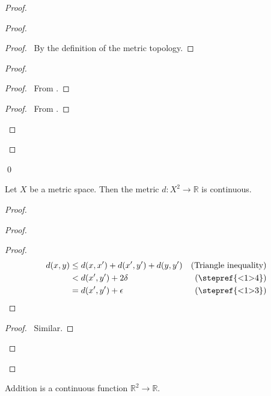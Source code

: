 \begin{proof}
\begin{proof}
    \begin{proof}
      \pf\ By the definition of the metric topology.
    \end{proof}
    \begin{proof}
      \begin{proof}
        \pf\ From .
      \end{proof}
      \begin{proof}
        \pf\ From .
      \end{proof}
    \end{proof}
  \end{proof}
  \qed
\end{proof}

\begin{lm}
  \label{lm:topology:metric:continuous}
  Let $X$ be a metric space. Then the metric $d : X^2 \rightarrow \mathbb{R}$ is continuous.
\end{lm}

\begin{proof}
  \pf
  \begin{proof}
    \begin{proof}
      \pf\
      \begin{align*}
        d(x,y) & \leq d(x,x') + d(x',y') + d(y,y') & (\text{Triangle inequality}) \\
        & < d(x',y') + 2 \delta & (\text{\stepref{<1>4}}) \\
        & = d(x',y') + \epsilon & (\text{\stepref{<1>3}})
      \end{align*}
    \end{proof}
    \begin{proof}
      \pf\ Similar.
    \end{proof}
  \end{proof}
\end{proof}

\begin{lm}
  \label{lm:metric:metric:addition}
  Addition is a continuous function $\mathbb{R}^2 \rightarrow \mathbb{R}$.
\end{lm}

